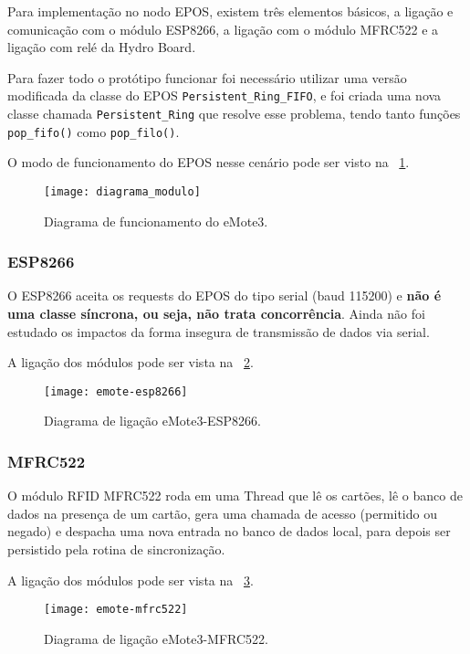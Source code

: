 \documentclass[11pt]{article}
\begin{document}
Para implementação no nodo EPOS, existem três elementos básicos, a ligação e comunicação com o módulo ESP8266, a ligação com o módulo MFRC522 e a ligação com relé da Hydro Board.

Para fazer todo o protótipo funcionar foi necessário utilizar uma versão modificada da classe do EPOS \texttt{Persistent\_Ring\_FIFO}, e foi criada uma nova classe chamada \texttt{Persistent\_Ring} que resolve esse problema, tendo tanto funções \texttt{pop\_fifo()} como \texttt{pop\_filo()}.

O modo de funcionamento do EPOS nesse cenário pode ser visto na \figurename~\ref{fig:diagrama_modulo}.

\begin{figure}[!ht]
\centering
\texttt{[image: diagrama\_modulo]}
\caption{Diagrama de funcionamento do eMote3.} \label{fig:diagrama_modulo}
\end{figure}

\subsubsection{ESP8266}

O ESP8266 aceita os requests do EPOS do tipo serial (baud 115200) e \textbf{não é uma classe síncrona, ou seja, não trata concorrência}. Ainda não foi estudado os impactos da forma insegura de transmissão de dados via serial.

A ligação dos módulos pode ser vista na \figurename~\ref{fig:emote-esp8266}.

\begin{figure}[!ht]
\centering
\texttt{[image: emote-esp8266]}
\caption{Diagrama de ligação eMote3-ESP8266.} \label{fig:emote-esp8266}
\end{figure}

\subsubsection{MFRC522}

O módulo RFID MFRC522 roda em uma Thread que lê os cartões, lê o banco de dados na presença de um cartão, gera uma chamada de acesso (permitido ou negado) e despacha uma nova entrada no banco de dados local, para depois ser persistido pela rotina de sincronização.

A ligação dos módulos pode ser vista na \figurename~\ref{fig:emote-mfrc522}.

\begin{figure}[!ht]
\centering
\texttt{[image: emote-mfrc522]}
\caption{Diagrama de ligação eMote3-MFRC522.} \label{fig:emote-mfrc522}
\end{figure}
\end{document}
